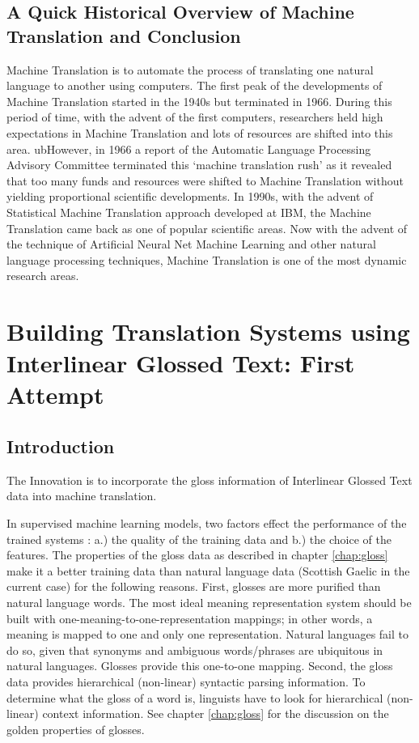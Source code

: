 \documentclass[final]{ua-thesis}
\numberwithin{equation}{section}
\begin{document}
\section{A Quick Historical Overview of Machine Translation and Conclusion}

Machine Translation is to automate the process of translating one natural language to another using computers. The first peak of the developments of Machine Translation started in the 1940s but terminated in 1966. During this period of time, with the advent of the first computers, researchers held high expectations in Machine Translation and lots of resources are shifted into this area. 
ubHowever, in 1966 a report of the Automatic Language Processing Advisory Committee \citep{pierce1966language} terminated this `machine translation rush' as it revealed that too many funds and resources were shifted to Machine Translation without yielding proportional scientific developments. In 1990s, with the advent of Statistical Machine Translation approach developed at IBM, the Machine Translation came back as one of popular scientific areas. Now with the advent of the technique of Artificial Neural Net Machine Learning and other natural language processing techniques, Machine Translation is one of the most dynamic research areas.    
\chapter{Building Translation Systems using Interlinear Glossed Text: First Attempt}
\label{chap:cake}


\section{Introduction}
The Innovation is to incorporate the gloss information of Interlinear Glossed Text data into machine translation.

In supervised machine learning models, two factors effect the performance of the trained systems \citep{kotsiantis2007supervised}: a.) the quality of the training data and b.) the choice of the features. The properties of the gloss data as described in chapter \ref{chap:gloss} make it a better training data than natural language data (Scottish Gaelic in the current case) for the following reasons. First, glosses are more purified than natural language words. The most ideal meaning representation system should be built with one-meaning-to-one-representation mappings; in other words, a meaning is mapped to one and only one representation. Natural languages fail to do so, given that synonyms and ambiguous words/phrases are ubiquitous in natural languages. Glosses provide this one-to-one mapping. Second, the gloss data provides hierarchical (non-linear) syntactic parsing information. To determine what the gloss of a word is, linguists have to look for hierarchical (non-linear) context information. See chapter \ref{chap:gloss} for the discussion on the golden properties of glosses.  
\end{document}
